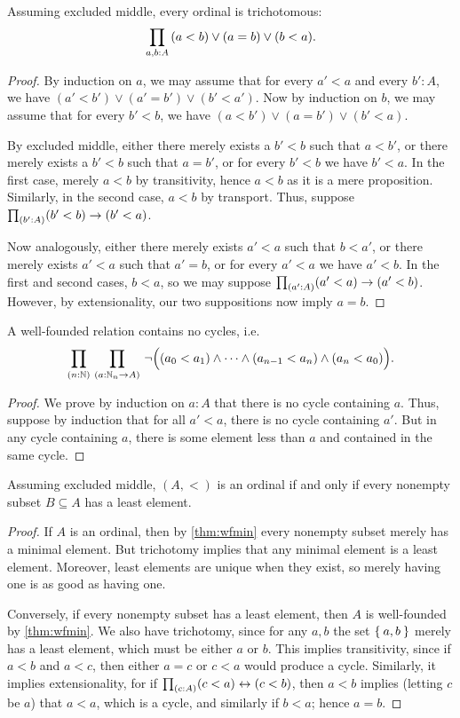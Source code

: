 \begin{lem}
  Assuming excluded middle, every ordinal is trichotomous:
  \[ \prd{a,b:A} (a<b) \vee (a=b) \vee (b<a). \]
\end{lem}
\begin{proof}
  By induction on $a$, we may assume that for every $a'<a$ and every $b':A$, we have $(a'<b') \vee (a'=b') \vee (b'<a')$.
  Now by induction on $b$, we may assume that for every $b'<b$, we have $(a<b') \vee (a=b') \vee (b'<a)$.

  By excluded middle, either there merely exists a $b'<b$ such that $a<b'$, or there merely exists a $b'<b$ such that $a=b'$, or for every $b'<b$ we have $b'<a$.
  In the first case, merely $a<b$ by transitivity, hence $a<b$ as it is a mere proposition.
  Similarly, in the second case, $a<b$ by transport.
  Thus, suppose $\prd{b':A}(b'<b)\to (b'<a)$.

  Now analogously, either there merely exists $a'<a$ such that $b<a'$, or there merely exists $a'<a$ such that $a'=b$, or for every $a'<a$ we have $a'<b$.
  In the first and second cases, $b<a$, so we may suppose $\prd{a':A}(a'<a)\to (a'<b)$.
  However, by extensionality, our two suppositions now imply $a=b$.
\end{proof}

\begin{lem}
  A well-founded relation contains no cycles, i.e.\
  \[ \prd{n:\mathbb{N}}{a:\mathbb{N}_n\to A} \neg\Big((a_0<a_1) \wedge \dots \wedge (a_{n-1}<a_n)\wedge (a_n<a_0)\Big). \]
\end{lem}
\begin{proof}
  We prove by induction on $a:A$ that there is no cycle containing $a$.
  Thus, suppose by induction that for all $a'<a$, there is no cycle containing $a'$.
  But in any cycle containing $a$, there is some element less than $a$ and contained in the same cycle.
\end{proof}

\begin{thm}\label{thm:wellorder}
  Assuming excluded middle, $(A,<)$ is an ordinal if and only if every nonempty subset $B\subseteq A$ has a least element.
\end{thm}
\begin{proof}
  If $A$ is an ordinal, then by \autoref{thm:wfmin} every nonempty subset merely has a minimal element.
  But trichotomy implies that any minimal element is a least element.
  Moreover, least elements are unique when they exist, so merely having one is as good as having one.

  Conversely, if every nonempty subset has a least element, then $A$ is well-founded by \autoref{thm:wfmin}.
  We also have trichotomy, since for any $a,b$ the set $\Set{a,b}$ merely has a least element, which must be either $a$ or $b$.
  This implies transitivity, since if $a<b$ and $a<c$, then either $a=c$ or $c<a$ would produce a cycle.
  Similarly, it implies extensionality, for if $\prd{c:A}(c<a)\leftrightarrow (c<b)$, then $a<b$ implies (letting $c$ be $a$) that $a<a$, which is a cycle, and similarly if $b<a$; hence $a=b$.
\end{proof}

